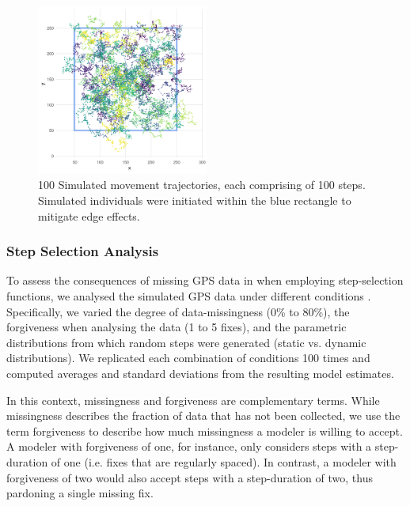 \documentclass[abstract=on,10pt,a4paper,bibliography=totocnumbered]{article}
\begin{document}
\begin{figure}
  \begin{center}
  \includegraphics[width = 0.5\textwidth]{99_Simulations.png}
  \caption{100 Simulated movement trajectories, each comprising of 100 steps.
  Simulated individuals were initiated within the blue rectangle to mitigate
  edge effects.}
  \label{Simulations}
  \end{center}
\end{figure}

\subsubsection{Step Selection Analysis}
To assess the consequences of missing GPS data in when employing step-selection
functions, we analysed the simulated GPS data under different conditions
. Specifically, we varied the degree of data-missingness (0\% to
80\%), the forgiveness when analysing the data (1 to 5 fixes), and the
parametric distributions from which random steps were generated (static vs.
dynamic distributions). We replicated each combination of conditions 100 times
and computed averages and standard deviations from the resulting model
estimates.

In this context, missingness and forgiveness are complementary terms. While
missingness describes the fraction of data that has not been collected, we use
the term forgiveness to describe how much missingness a modeler is willing to
accept. A modeler with forgiveness of one, for instance, only considers steps
with a step-duration of one (i.e. fixes that are regularly spaced). In contrast,
a modeler with forgiveness of two would also accept steps with a step-duration
of two, thus pardoning a single missing fix.
\end{document}
